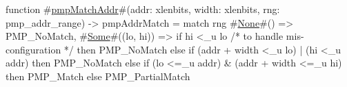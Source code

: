 function #\hyperref[sailRISCVzpmpMatchAddr]{pmpMatchAddr}#(addr: xlenbits, width: xlenbits, rng: pmp_addr_range) -> pmpAddrMatch = {
  match rng {
    #\hyperref[sailRISCVzNone]{None}#()         => PMP_NoMatch,
    #\hyperref[sailRISCVzSome]{Some}#((lo, hi)) => if   hi <_u lo   /* to handle mis-configuration */
                      then PMP_NoMatch
                      else {
                        if      (addr + width <_u lo) | (hi <_u addr)
                        then    PMP_NoMatch
                        else if (lo <=_u addr) & (addr + width <=_u hi)
                        then    PMP_Match
                        else    PMP_PartialMatch
                      }
  }
}
